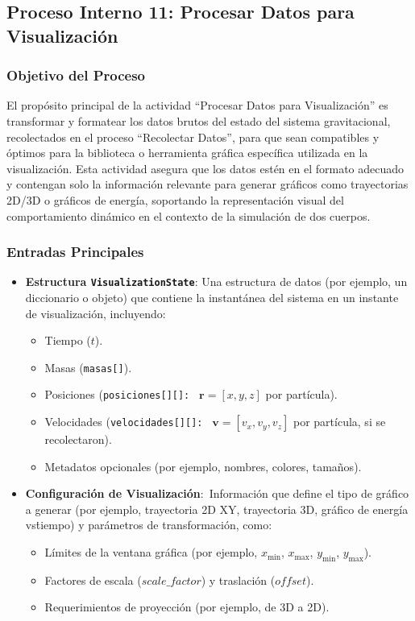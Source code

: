 \subsection[Proceso Interno: Procesar Datos]{Proceso Interno 11: Procesar Datos para Visualización}

\subsubsection{Objetivo del Proceso}
El propósito principal de la actividad ``Procesar Datos para Visualización'' es transformar y formatear los datos brutos del estado del sistema gravitacional, recolectados en el proceso ``Recolectar Datos'', para que sean compatibles y óptimos para la biblioteca o herramienta gráfica específica utilizada en la visualización. Esta actividad asegura que los datos estén en el formato adecuado y contengan solo la información relevante para generar gráficos como trayectorias 2D/3D o gráficos de energía, soportando la representación visual del comportamiento dinámico en el contexto de la simulación de dos cuerpos.

\subsubsection{Entradas Principales}
\begin{itemize}
    \item \textbf{Estructura \texttt{VisualizationState}}: Una estructura de datos (por ejemplo, un diccionario o objeto) que contiene la instantánea del sistema en un instante de visualización, incluyendo:
    \begin{itemize}
        \item Tiempo ($t$).
        \item Masas (\texttt{masas[]}).
        \item Posiciones (\texttt{posiciones[][]: } $\mathbf{r} = [x, y, z]$ por partícula).
        \item Velocidades (\texttt{velocidades[][]: } $\mathbf{v} = [v_x, v_y, v_z]$ por partícula, si se recolectaron).
        \item Metadatos opcionales (por ejemplo, nombres, colores, tamaños).
    \end{itemize}
    \item \textbf{Configuración de Visualización}:\ Información que define el tipo de gráfico a generar (por ejemplo, trayectoria 2D XY, trayectoria 3D, gráfico de energía vs\. tiempo) y parámetros de transformación, como:
    \begin{itemize}
        \item Límites de la ventana gráfica (por ejemplo, $x_{\text{min}}$, $x_{\text{max}}$, $y_{\text{min}}$, $y_{\text{max}}$).
        \item Factores de escala ($scale\_factor$) y traslación ($offset$).
        \item Requerimientos de proyección (por ejemplo, de 3D a 2D).
    \end{itemize}
\end{itemize}


